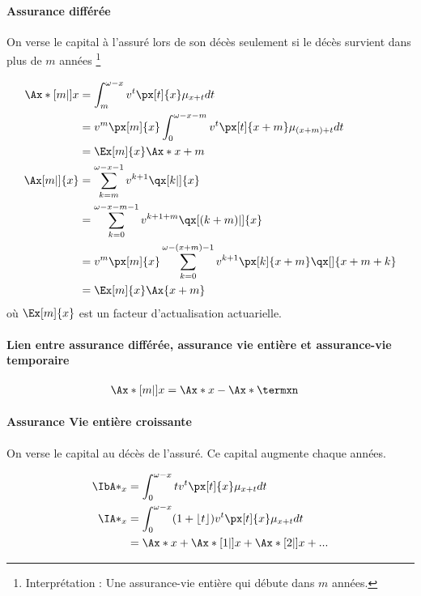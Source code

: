 \documentclass[10pt, french]{article}
\begin{document}
\begin{multicols*}{3}
\paragraph{Assurance différée} On verse le capital à l'assuré lors de son décès seulement si le décès survient dans plus de $m$ années \footnote{Interprétation : Une assurance-vie entière qui débute dans $m$ années.}

\begin{align*}
\Ax*[m|]{x}	& = \int_{m}^{\omega -x} v^t \px[t]{x} \mu_{x+t} dt \\
	& = v^m \px[m]{x} \int_{0}^{\omega - x - m} v^t \px[t]{x+m} \mu_{(x+m)+t} dt \\
	& = \Ex[m]{x} \Ax*{x+m} \\
\Ax[m|]{x}	& = \sum_{k=m}^{\omega - x -1} v^{k+1} \qx[k|]{x} \\
	& = \sum_{k=0}^{\omega - x - m - 1} v^{k+1+m} \qx[(k+m)|]{x} \\
	& = v^m \px[m]{x} \sum_{k=0}^{\omega - (x+m) - 1} v^{k+1} \px[k]{x+m} \qx[]{x+m+k} \\
	& = \Ex[m]{x} \Ax{x+m} \\
\end{align*}
où $\Ex[m]{x}$ est un facteur d'actualisation actuarielle.
\paragraph{Lien entre assurance différée, assurance vie entière et assurance-vie temporaire}

\begin{align*}
\Ax*[m|]{x}	& = \Ax*{x} - \Ax*{\termxn}
\end{align*}

\paragraph{Assurance Vie entière croissante} On verse le capital au décès de l'assuré. Ce capital augmente chaque années.

\begin{align*}
	\IbA*_x &= \int_0^{\omega - x} t v^t \px[t]{x} \mu_{x+t} dt \\
	\IA*_{x} &= \int_0^{\omega - x} (1 + \lfloor t \rfloor) v^t \px[t]{x} \mu_{x+t} dt \\
		&= \Ax*{x} + \Ax*[1|]{x} + \Ax*[2|]{x} + ...
\end{align*}


\end{multicols*}
\end{document}
